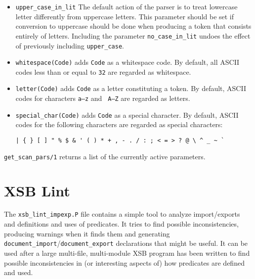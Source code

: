\begin{description}
\begin{itemize}
\item{{\tt upper\_case\_in\_lit}} The default action of the parser is
to treat lowercase letter differently from uppercase letters.  This
parameter should be set if conversion to uppercase should be done when
producing a token that consists entirely of letters.  Including the
parameter {\tt no\_case\_in\_lit} undoes the effect of previously
including {\tt upper\_case}.

\item{{\tt whitespace(Code)}} adds {\tt Code} as a whitespace code.
By default, all ASCII codes less than or equal to {\tt 32} are
regarded as whitespace.

\item{{\tt letter(Code)}} adds {\tt Code} as a letter constituting a
token. By default, ASCII codes for characters {\tt a--z} and {\tt
A--Z} are regarded as letters.

\item{{\tt special\_char(Code)}} adds {\tt Code} as a special
  character.  By default, ASCII codes for the following characters are
  regarded as special characters:

\begin{verbatim}
| { } [ ] " % $ & ' ( ) * + , - . / : ; < = > ? @ \ ^ _ ~ `
\end{verbatim}
\end{itemize}

%
{\tt get\_scan\_pars/1} returns a list of the currently active
parameters.

\end{description} 

\section{XSB Lint}

The {\tt xsb\_lint\_impexp.P} file contains a simple tool to analyze
import/exports and definitions and uses of predicates.  It tries to
find possible inconsistencies, producing warnings when it finds them
and generating {\tt document\_import}/{\tt document\_export}
declarations that might be useful.  It can be used after a large
multi-file, multi-module XSB program has been written to find possible
inconsistencies in (or interesting aspects of) how predicates are
defined and used.


